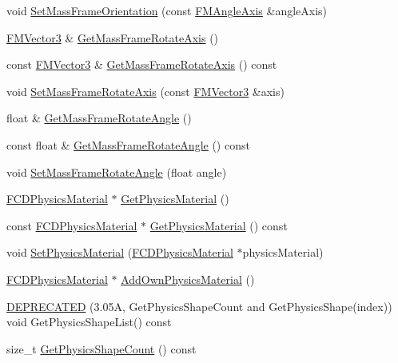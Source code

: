 \begin{DoxyCompactItemize}
\item 
void \hyperlink{classFCDPhysicsRigidBodyParameters_a6545300314f53765d8b9ed9c0c783369}{SetMassFrameOrientation} (const \hyperlink{classFMAngleAxis}{FMAngleAxis} \&angleAxis)
\item 
\hyperlink{classFMVector3}{FMVector3} \& \hyperlink{classFCDPhysicsRigidBodyParameters_a9cc7558b94c1f22671a0d00420c7738d}{GetMassFrameRotateAxis} ()
\item 
const \hyperlink{classFMVector3}{FMVector3} \& \hyperlink{classFCDPhysicsRigidBodyParameters_afa128a7fc6c27a62feb34b93bfb951af}{GetMassFrameRotateAxis} () const 
\item 
void \hyperlink{classFCDPhysicsRigidBodyParameters_a958c32e4b84c82eac3921d80daeaea85}{SetMassFrameRotateAxis} (const \hyperlink{classFMVector3}{FMVector3} \&axis)
\item 
float \& \hyperlink{classFCDPhysicsRigidBodyParameters_add588a304d97ff2a72d18863feeaebcd}{GetMassFrameRotateAngle} ()
\item 
const float \& \hyperlink{classFCDPhysicsRigidBodyParameters_a481b7fa2eca01e3b8094c3be98f3a30d}{GetMassFrameRotateAngle} () const 
\item 
void \hyperlink{classFCDPhysicsRigidBodyParameters_a576689c5240f33a46c5022e2f61e45a6}{SetMassFrameRotateAngle} (float angle)
\item 
\hyperlink{classFCDPhysicsMaterial}{FCDPhysicsMaterial} $\ast$ \hyperlink{classFCDPhysicsRigidBodyParameters_afd559982b8e159df2f170bd1e66d264c}{GetPhysicsMaterial} ()
\item 
const \hyperlink{classFCDPhysicsMaterial}{FCDPhysicsMaterial} $\ast$ \hyperlink{classFCDPhysicsRigidBodyParameters_a2d39baa56002677e743e0ebce9b8b3f0}{GetPhysicsMaterial} () const 
\item 
void \hyperlink{classFCDPhysicsRigidBodyParameters_a1b90826971c6a969d195006cd9f54eec}{SetPhysicsMaterial} (\hyperlink{classFCDPhysicsMaterial}{FCDPhysicsMaterial} $\ast$physicsMaterial)
\item 
\hyperlink{classFCDPhysicsMaterial}{FCDPhysicsMaterial} $\ast$ \hyperlink{classFCDPhysicsRigidBodyParameters_a52924ea642fe5cec458f44c7c2407f1b}{AddOwnPhysicsMaterial} ()
\item 
\hyperlink{classFCDPhysicsRigidBodyParameters_a339e09c1936b6e2a28e0f5d03ab365ff}{DEPRECATED} (3.05A, GetPhysicsShapeCount and GetPhysicsShape(index)) void GetPhysicsShapeList() const 
\item 
size\_\-t \hyperlink{classFCDPhysicsRigidBodyParameters_ad58b51fb6ed112d070f7258f8cfa0dc4}{GetPhysicsShapeCount} () const 

\end{DoxyCompactItemize}
